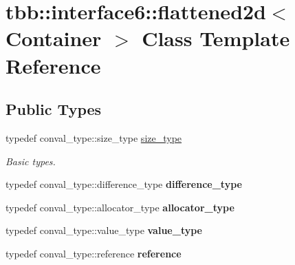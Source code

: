 \hypertarget{classtbb_1_1interface6_1_1flattened2d}{}\section{tbb\+:\+:interface6\+:\+:flattened2d$<$ Container $>$ Class Template Reference}
\label{classtbb_1_1interface6_1_1flattened2d}
\subsection*{Public Types}
\begin{DoxyCompactItemize}
\item 
\hypertarget{classtbb_1_1interface6_1_1flattened2d_a8b84f8f2cc4499f49d17141eaedc99c0}{}typedef conval\+\_\+type\+::size\+\_\+type \hyperlink{classtbb_1_1interface6_1_1flattened2d_a8b84f8f2cc4499f49d17141eaedc99c0}{size\+\_\+type}\label{classtbb_1_1interface6_1_1flattened2d_a8b84f8f2cc4499f49d17141eaedc99c0}

\begin{DoxyCompactList}\small\item\em Basic types. \end{DoxyCompactList}\item 
\hypertarget{classtbb_1_1interface6_1_1flattened2d_ab0352636ee7434478866739224852d32}{}typedef conval\+\_\+type\+::difference\+\_\+type {\bfseries difference\+\_\+type}\label{classtbb_1_1interface6_1_1flattened2d_ab0352636ee7434478866739224852d32}

\item 
\hypertarget{classtbb_1_1interface6_1_1flattened2d_a426e0eab82833206df0dc36648419647}{}typedef conval\+\_\+type\+::allocator\+\_\+type {\bfseries allocator\+\_\+type}\label{classtbb_1_1interface6_1_1flattened2d_a426e0eab82833206df0dc36648419647}

\item 
\hypertarget{classtbb_1_1interface6_1_1flattened2d_a7070453b83df5930615d4307eb2f38b5}{}typedef conval\+\_\+type\+::value\+\_\+type {\bfseries value\+\_\+type}\label{classtbb_1_1interface6_1_1flattened2d_a7070453b83df5930615d4307eb2f38b5}

\item 
\hypertarget{classtbb_1_1interface6_1_1flattened2d_a92b8ef6b07970e3f973b3ece9d2a6201}{}typedef conval\+\_\+type\+::reference {\bfseries reference}\label{classtbb_1_1interface6_1_1flattened2d_a92b8ef6b07970e3f973b3ece9d2a6201}


\end{DoxyCompactItemize}
